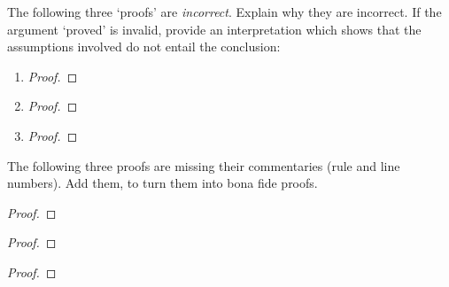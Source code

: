 \practiceproblems
\problempart
The following three `proofs' are \emph{incorrect}. Explain why they are incorrect. If the argument `proved' is invalid, provide an interpretation which shows that the assumptions involved do not entail the conclusion:
\begin{enumerate}
	\item 
	\begin{proof}
	\end{proof}
\item	\begin{proof}
		\open
		\close
	\end{proof}
\item \begin{proof}
	\open{}
	\open
	\open
	\close
	\close
	\close
\end{proof}
\end{enumerate}
\newpage
\problempart 
\label{pr.justifyFOLproof}
The following three proofs are missing their commentaries (rule and line numbers). Add them, to turn them into bona fide proofs. 
\begin{multicols}{2}\begin{proof}
\open{}
	\open
\open
{}
\close
\open
{}
\open
{}
\close
{}%
\close
{}%
	\close
{}%
\end{proof}
\begin{proof}
\open{}
 {}
 {}
\end{proof}
\begin{proof}
\open{}
\open	{}
\open
\close
{}
\end{proof}
\end{multicols}


